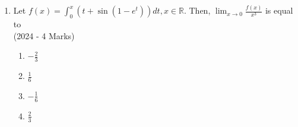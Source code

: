 \documentclass[journal]{IEEEtran}
\begin{document}
\begin{enumerate}
{		}

    \item{
        
           
           	Let $f(x)=\int_{0}^{x}\left(t+\sin \left(1-e^{t}\right)\right) d t, x \in \mathbb{R}$. Then, $\lim _{x \rightarrow 0} \frac{f(x)}{x^{3}}$ is equal to\\ \text{ }
             \hfill
              {(2024 - 4 Marks)}
			\begin{multicols}{2}              
	              		\begin{enumerate}
	              			\item $-\frac{2}{3}$
	              			\item $\frac{1}{6}$
	              			\item $-\frac{1}{6}$
	              			\item $\frac{2}{3}$
	              	\end{enumerate}
  			\end{multicols}      
        }
    \end{enumerate}
\end{document}
